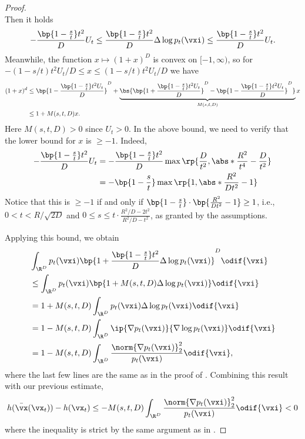 \documentclass[../../book-main.tex]{subfiles}
\begin{document}
\begin{proof}
\begin{equation}
    \end{equation}
    Then it holds
    \begin{equation}
        -\frac{\bp{1 - \frac{s}{t}}t^{2}}{D}U_{t} \leq \frac{\bp{1 - \frac{s}{t}}t^{2}}{D}\Delta \log p_{t}(\vxi) \leq \frac{\bp{1 - \frac{s}{t}}t^{2}}{D}U_{t}.
    \end{equation}
    Meanwhile, the function \(x \mapsto (1 + x)^{D}\) is convex on \([-1, \infty)\), so for
    \(-(1-s/t)t^{2}U_{t}/D \leq x \leq (1-s/t)t^{2}U_{t}/D\) we have 
    \begin{align}
        (1 + x)^{d} 
        &\leq \bp{1 - \frac{\bp{1 - \frac{s}{t}}t^{2}U_{t}}{D}}^{D} + \underbrace{\bs{\bp{1 + \frac{\bp{1 - \frac{s}{t}}t^{2}U_{t}}{D}}^{D} - \bp{1 - \frac{\bp{1 - \frac{s}{t}}t^{2}U_{t}}{D}}^{D}}}_{M(s, t, D)}x \\ 
        &\leq 1 + M(s, t, D)x.
    \end{align}
    Here \(M(s, t, D) > 0\) since \(U_{t} > 0\). In the above bound, we need to verify that the lower bound for \(x\) is \(\geq -1\). Indeed,
    \begin{align}
        -\frac{\bp{1 - \frac{s}{t}}t^{2}}{D}U_{t}
        &= -\frac{\bp{1 - \frac{s}{t}}t^{2}}{D}\max\rp{\frac{D}{t^{2}}, \abs*{\frac{R^{2}}{t^{4}} - \frac{D}{t^{2}}}} \\ 
        &= -\bp{1 - \frac{s}{t}}\max\rp{1, \abs*{\frac{R^{2}}{Dt^{2}} - 1}}
    \end{align}
    Notice that this is \(\geq -1\) if and only if \(\bp{1 - \frac{s}{t}}\cdot\bp{\frac{R^{2}}{Dt^{2}} - 1} \geq 1\), i.e., \(0 < t < R/\sqrt{2D}\) and \(0 \leq s \leq t\cdot\frac{R^{2}/D - 2t^{2}}{R^{2}/D - t^{2}}\), as granted by the assumptions.
    
    Applying this bound, we obtain
    \begin{align}
        &\int_{\R^{D}} p_{t}(\vxi)\bp{1 + \frac{\bp{1 - \frac{s}{t}}t^{2}}{D}\Delta \log p_{t}(\vxi)}^{D}\odif{\vxi} \\ 
        &\leq \int_{\R^{D}}p_{t}(\vxi)\bp{1 + M(s, t, D)\Delta \log p_{t}(\vxi)}\odif{\vxi} \\
        &= 1 + M(s, t, D)\int_{\R^{D}}p_{t}(\vxi)\Delta \log p_{t}(\vxi)\odif{\vxi} \\
        &= 1 - M(s, t, D)\int_{\R^{D}}\ip{\nabla p_{t}(\vxi)}{\nabla\log p_{t}(\vxi)}\odif{\vxi} \\
        &= 1 - M(s, t, D)\int_{\R^{D}}\frac{\norm{\nabla p_{t}(\vxi)}_{2}^{2}}{p_{t}(\vxi)}\odif{\vxi},
    \end{align}
    where the last few lines are the same as in the proof of . Combining this result with our previous estimate,
    \begin{equation}
        h(\bar{\vx}(\vx_{t})) - h(\vx_{t}) \leq - M(s, t, D)\int_{\R^{D}}\frac{\norm{\nabla p_{t}(\vxi)}_{2}^{2}}{p_{t}(\vxi)}\odif{\vxi} < 0
    \end{equation}
    where the inequality is strict by the same argument as in .
\end{proof}
\end{document}
